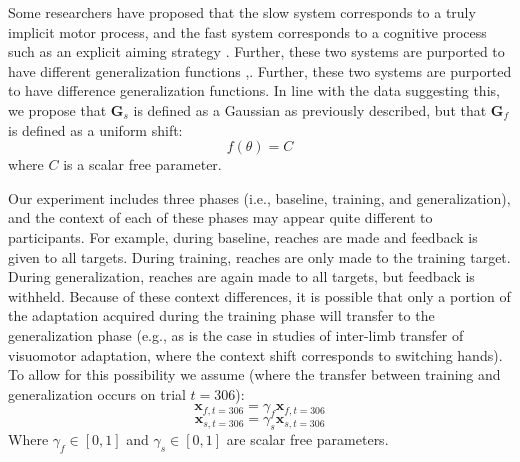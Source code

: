 \documentclass[jou, 11pt, longtable, floatsintext, notab]{apa6}
\begin{document}
Some researchers have proposed that the slow system
corresponds to a truly implicit motor process, and the fast
system corresponds to a cognitive process such as an
explicit aiming strategy \cite{mcdougle_taking_2016}.
Further, these two systems are purported to have different
generalization functions
\cite{heuer_generalization_2011},\cite{mcdougle_implications_2017}.
Further, these two systems are purported to have difference
generalization functions. In line with the data suggesting
this, we propose that $\boldsymbol{G}_{s}$ is defined as a
Gaussian as previously described, but that
$\boldsymbol{G}_{f}$ is defined as a uniform shift:
\begin{equation}
  f(\theta) = C
\end{equation}
where $C$ is a scalar free parameter.

Our experiment includes three phases (i.e., baseline,
training, and generalization), and the context of each of
these phases may appear quite different to participants. For
example, during baseline, reaches are made and feedback is
given to all targets. During training, reaches are only made
to the training target. During generalization, reaches are
again made to all targets, but feedback is withheld. Because
of these context differences, it is possible that only a
portion of the adaptation acquired during the training phase
will transfer to the generalization phase (e.g., as is the
case in studies of inter-limb transfer of visuomotor
adaptation, where the context shift corresponds to switching
hands). To allow for this possibility we assume (where the
transfer between training and generalization occurs on trial
$t=306$):
\begin{equation}
  \boldsymbol{x}_{f, t=306} = \gamma_{f} \boldsymbol{x}_{f, t=306} 
\end{equation}
\begin{equation}
  \boldsymbol{x}_{s, t=306} = \gamma_{s} \boldsymbol{x}_{s, t=306} 
\end{equation}
Where $\gamma_{f} \in [0,1]$ and $\gamma_{s} \in [0,1]$ are
scalar free parameters. 
\end{document}
